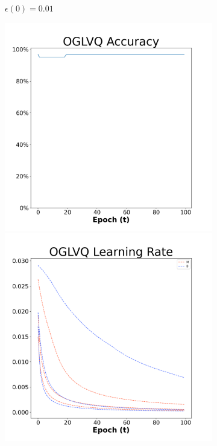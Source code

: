\begin{figure}[H]
\begin{subfigure}{0.3\textwidth}
  \caption{$\epsilon(0)=0.01$}
\end{subfigure}\hfil %
\begin{subfigure}{0.3\textwidth}
  \includegraphics[width=\linewidth]{images/exper1/breast/OGLVQ_0.03_acc.png}
  \includegraphics[width=\linewidth]{images/exper1/breast/OGLVQ_0.03_lr.png}

\end{subfigure}
\end{figure}

